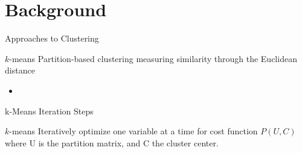\documentclass[aspectratio=1610]{beamer}
\begin{document}
\section{Background}

\begin{frame}{Approaches to Clustering}
    \begin{block}{$k$-means}
      Partition-based clustering measuring similarity through the \alert{Euclidean} distance
  \end{block}
    \begin{itemize}
      \item {}
    \end{itemize}

\end{frame}

\begin{frame}{k-Means Iteration Steps}
\begin{block}{$k$-means}
  Iteratively optimize one variable at a time for cost function \alert{$P(U,C)$} where \alert{U} is the partition matrix, and \alert{C} the cluster center.
\end{block}
\begin{center}
\begin{description}
\end{description}
\end{center}
\end{frame}
\end{document}
